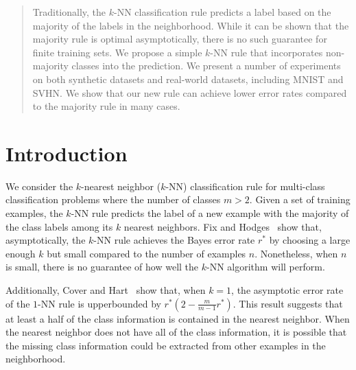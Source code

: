 \documentclass{article}
\begin{document}
 


\begin{abstract}
  Traditionally, the $k$-NN classification rule predicts a label based
  on the majority of the labels in the neighborhood. While it can be
  shown that the majority rule is optimal asymptotically, there is no
  such guarantee for finite training sets. We propose a simple $k$-NN
  rule that incorporates non-majority classes into the prediction. We
  present a number of experiments on both synthetic datasets and
  real-world datasets, including MNIST and SVHN. We show that our new
  rule can achieve lower error rates compared to the majority rule in
  many cases.
\end{abstract} 

\section{Introduction}
\label{sec:intro}

We consider the $k$-nearest neighbor ($k$-NN) classification rule for
multi-class classification problems where the number of classes $m >
2$. Given a set of training examples, the $k$-NN rule predicts the
label of a new example with the majority of the class labels among its
$k$ nearest neighbors. Fix and Hodges~\cite{Fix1951} show that,
asymptotically, the $k$-NN rule achieves the Bayes error rate $r^*$ by
choosing a large enough $k$ but small compared to the number of
examples $n$. Nonetheless, when $n$ is small, there is no guarantee of
how well the $k$-NN algorithm will perform. 

Additionally, Cover and Hart~\cite{Cover1967} show that, when $k = 1$,
the asymptotic error rate of the $1$-NN rule is upperbounded by $r^*(2
- \frac{m}{m-1}r^*)$. This result suggests that at least a half of the
class information is contained in the nearest neighbor. When the
nearest neighbor does not have all of the class information, it is
possible that the missing class information could be extracted from
other examples in the neighborhood.
\end{document}
